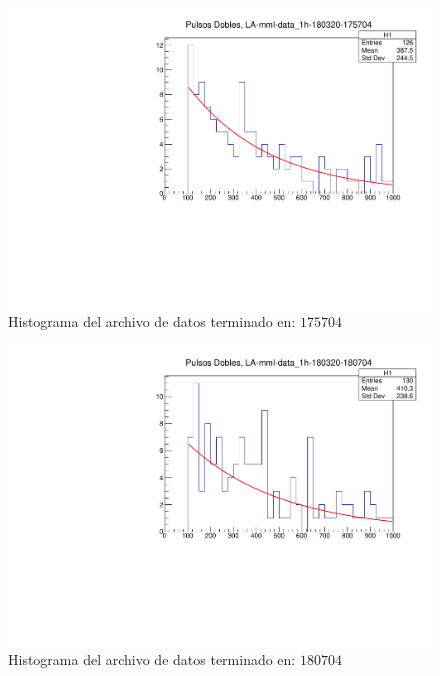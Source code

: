 \documentclass[conference]{IEEEtran}
\begin{document}
        \begin{figure}[H]
            \centering
            \includegraphics[scale=0.4]{./Imagenes/file3.pdf}
            \caption{Histograma del archivo de datos terminado en: $175704$}
            \label{fig:file3}
        \end{figure}  
        \begin{figure}[H]
            \centering
            \includegraphics[scale=0.4]{./Imagenes/file4.pdf}
            \caption{Histograma del archivo de datos terminado en: $180704$}
            \label{fig:file4}
         \end{figure} 
\end{document}
